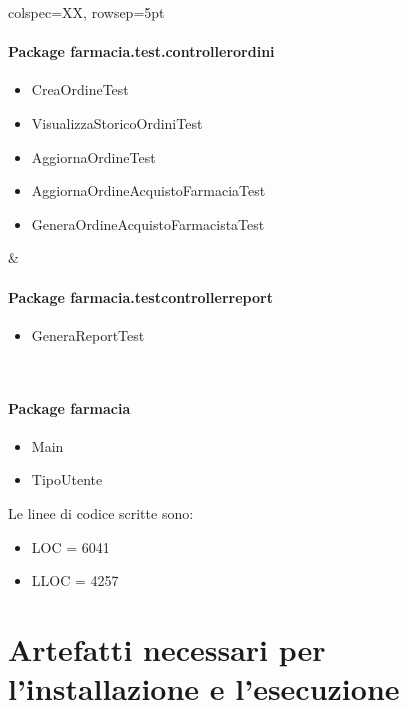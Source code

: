\begin{table}[pt]
\begin{tblr}{colspec=XX, rowsep=5pt}
\begin{minipage}[t]{0.45\textwidth}
			\paragraph{Package farmacia.test.controllerordini}
			\begin{itemize}[label=--]
				\item CreaOrdineTest
				\item VisualizzaStoricoOrdiniTest
				\item AggiornaOrdineTest
				\item AggiornaOrdineAcquistoFarmaciaTest
				\item GeneraOrdineAcquistoFarmacistaTest
			\end{itemize}
		\end{minipage} &
		\begin{minipage}[t]{0.4\textwidth}
			\paragraph{Package farmacia.testcontrollerreport}
			\begin{itemize}[label=--]
				\item GeneraReportTest
			\end{itemize}
		\end{minipage} \\
		\begin{minipage}[t]{0.5\textwidth}
			\paragraph{Package farmacia}
			\begin{itemize}[label=--]
				\item Main
				\item TipoUtente
			\end{itemize}
		\end{minipage}
	\end{tblr}
\end{table}

\vfill
\pagebreak

Le linee di codice scritte sono:

\begin{itemize}[label=--]
	\item LOC = 6041
	\item LLOC = 4257
\end{itemize}

\section{Artefatti necessari per l'installazione e l'esecuzione}

